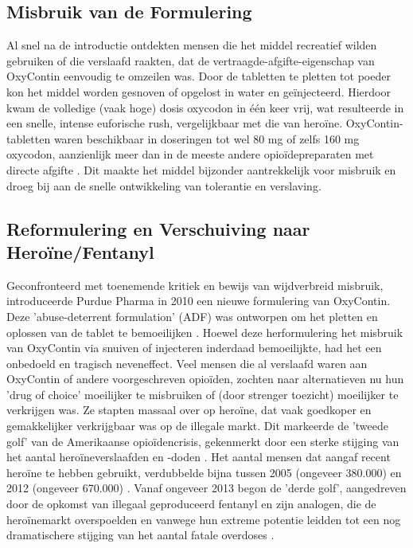 \documentclass[11pt, a4paper]{report} %
\begin{document}
\subsection{Misbruik van de Formulering}
Al snel na de introductie ontdekten mensen die het middel recreatief wilden gebruiken of die verslaafd raakten, dat de vertraagde-afgifte-eigenschap van OxyContin eenvoudig te omzeilen was. Door de tabletten te pletten tot poeder kon het middel worden gesnoven of opgelost in water en geïnjecteerd. Hierdoor kwam de volledige (vaak hoge) dosis oxycodon in één keer vrij, wat resulteerde in een snelle, intense euforische rush, vergelijkbaar met die van heroïne. OxyContin-tabletten waren beschikbaar in doseringen tot wel 80 mg of zelfs 160 mg oxycodon, aanzienlijk meer dan in de meeste andere opioïdepreparaten met directe afgifte \parencite{Cicero2017Review}. Dit maakte het middel bijzonder aantrekkelijk voor misbruik en droeg bij aan de snelle ontwikkeling van tolerantie en verslaving.

\subsection{Reformulering en Verschuiving naar Heroïne/Fentanyl}
Geconfronteerd met toenemende kritiek en bewijs van wijdverbreid misbruik, introduceerde Purdue Pharma in 2010 een nieuwe formulering van OxyContin. Deze 'abuse-deterrent formulation' (ADF) was ontworpen om het pletten en oplossen van de tablet te bemoeilijken \parencite{HealthlineDopesickTruth}. Hoewel deze herformulering het misbruik van OxyContin via snuiven of injecteren inderdaad bemoeilijkte, had het een onbedoeld en tragisch neveneffect. Veel mensen die al verslaafd waren aan OxyContin of andere voorgeschreven opioïden, zochten naar alternatieven nu hun 'drug of choice' moeilijker te misbruiken of (door strenger toezicht) moeilijker te verkrijgen was. Ze stapten massaal over op heroïne, dat vaak goedkoper en gemakkelijker verkrijgbaar was op de illegale markt. Dit markeerde de 'tweede golf' van de Amerikaanse opioïdencrisis, gekenmerkt door een sterke stijging van het aantal heroïneverslaafden en -doden \parencite{CDCUnderstandingEpidemic}. Het aantal mensen dat aangaf recent heroïne te hebben gebruikt, verdubbelde bijna tussen 2005 (ongeveer 380.000) en 2012 (ongeveer 670.000) \parencite{HealthlineDopesickTruth}. Vanaf ongeveer 2013 begon de 'derde golf', aangedreven door de opkomst van illegaal geproduceerd fentanyl en zijn analogen, die de heroïnemarkt overspoelden en vanwege hun extreme potentie leidden tot een nog dramatischere stijging van het aantal fatale overdoses \parencite{CDCUnderstandingEpidemic}.
\end{document}
